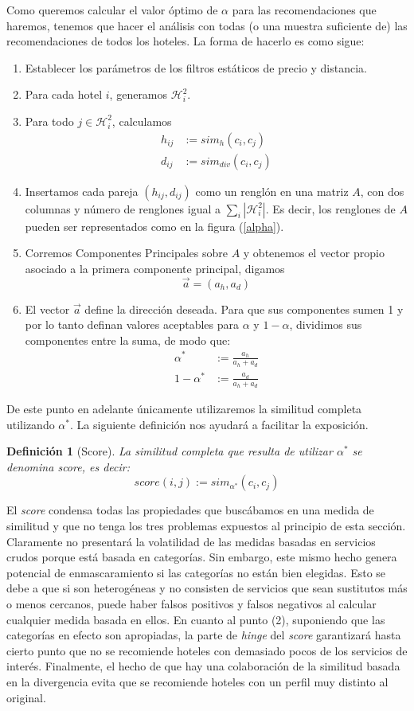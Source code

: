 \documentclass[12pt]{report}
\newtheorem{defn}{Definici\'on}[chapter]
\begin{document}
Como queremos calcular el valor óptimo de $\alpha$ para las recomendaciones que haremos, tenemos que hacer el análisis con todas (o una muestra suficiente de) las recomendaciones de todos los hoteles. La forma de hacerlo es como sigue:
\begin{enumerate}
	\item Establecer los parámetros de los filtros estáticos de precio y distancia.
	\item Para cada hotel $i$, generamos $\mathcal{H}_i^2$.
	\item Para todo $j \in \mathcal{H}_i^2$, calculamos
	\begin{align*}
		h_{ij} &:= sim_h(c_i, c_j)\\
		d_{ij} &:= sim_{div}(c_i, c_j)
	\end{align*}
	\item Insertamos cada pareja $(h_{ij}, d_{ij})$ como un renglón en una matriz $A$, con dos columnas y número de renglones igual a $\sum_i |\mathcal{H}_i^2|$. Es decir, los renglones de $A$ pueden ser representados como en la figura (\ref{alpha}).
	\item Corremos Componentes Principales sobre $A$ y obtenemos el vector propio asociado a la primera componente principal, digamos
	\[
	\vec{a} = (a_h, a_d)
	\]
	\item El vector $\vec{a}$ define la dirección deseada. Para que sus componentes sumen 1 y por lo tanto definan valores aceptables para $\alpha$ y $1 - \alpha$, dividimos sus componentes entre la suma, de modo que:
	\begin{align*}
		\alpha^* &:= \frac{a_h}{a_h + a_d}\\
		1 - \alpha^* &:= \frac{a_d}{a_h + a_d}
	\end{align*}
\end{enumerate}
De este punto en adelante únicamente utilizaremos la similitud completa utilizando $\alpha^*$. La siguiente definición nos ayudará a facilitar la exposición.
\begin{defn}[Score]
La similitud completa que resulta de utilizar $\alpha^*$ se denomina \emph{score}, es decir:
\[
score(i,j) := sim_{\alpha^*}(c_i, c_j)
\]
\end{defn}
El \emph{score} condensa todas las propiedades que buscábamos en una medida de similitud y que no tenga los tres problemas expuestos al principio de esta sección. Claramente no presentará la volatilidad de las medidas basadas en servicios crudos porque está basada en categorías. Sin embargo, este mismo hecho genera potencial de enmascaramiento si las categorías no están bien elegidas. Esto se debe a que si son heterogéneas y no consisten de servicios que sean sustitutos más o menos cercanos, puede haber falsos positivos y falsos negativos al calcular cualquier medida basada en ellos. En cuanto al punto (2), suponiendo que las categorías en efecto son apropiadas, la parte de \emph{hinge} del \emph{score} garantizará hasta cierto punto que no se recomiende hoteles con demasiado pocos de los servicios de interés. Finalmente, el hecho de que hay una colaboración de la similitud basada en la divergencia evita que se recomiende hoteles con un perfil muy distinto al original.
\end{document}
